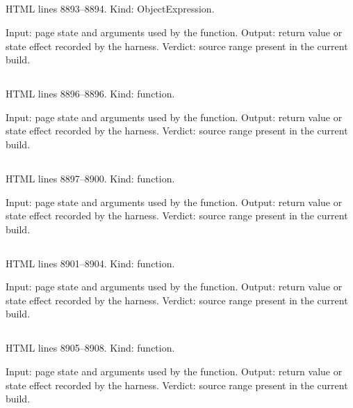 \subsection*{\texttt{}}
\label{vf_480_REVIEW_STATE}
HTML lines 8893--8894. Kind: ObjectExpression.

Input: page state and arguments used by the function.
Output: return value or state effect recorded by the harness.
Verdict: source range present in the current build.

\subsection*{\texttt{}}
\label{vf_481_runName}
HTML lines 8896--8896. Kind: function.

Input: page state and arguments used by the function.
Output: return value or state effect recorded by the harness.
Verdict: source range present in the current build.

\subsection*{\texttt{}}
\label{vf_482_shortDate}
HTML lines 8897--8900. Kind: function.

Input: page state and arguments used by the function.
Output: return value or state effect recorded by the harness.
Verdict: source range present in the current build.

\subsection*{\texttt{}}
\label{vf_483_displayRunTick}
HTML lines 8901--8904. Kind: function.

Input: page state and arguments used by the function.
Output: return value or state effect recorded by the harness.
Verdict: source range present in the current build.

\subsection*{\texttt{}}
\label{vf_484_runAt}
HTML lines 8905--8908. Kind: function.

Input: page state and arguments used by the function.
Output: return value or state effect recorded by the harness.
Verdict: source range present in the current build.

